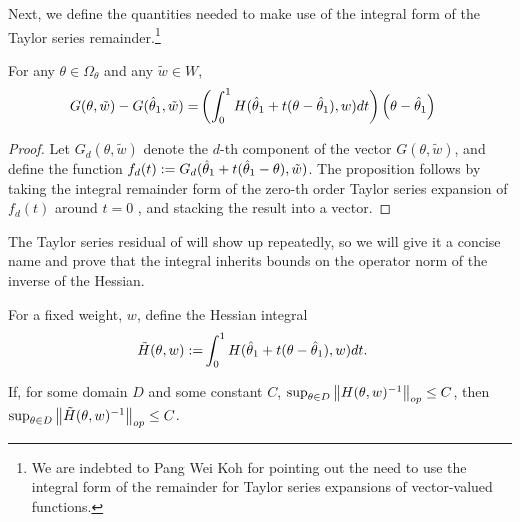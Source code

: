 Next, we define the quantities needed to make use of the integral form of
the Taylor series remainder.\footnote{We are indebted to Pang Wei Koh for
pointing out the need to use the integral form of the remainder for
Taylor series expansions of vector-valued functions.}

\begin{prop}
\label{propref:taylor_series_remainder}
%
For any $\theta \in \Omega_{\theta}$ and any $\tilde{w} \in W$,
%
\begin{align*}
G(\theta, \tilde{w}) - G(\hat{\theta}_{1}, \tilde{w}) =&
    \left(\int_0^1 H(\hat{\theta}_{1} + t (\theta - \hat{\theta}_{1}), w) dt\right)
    \left(\theta - \hat{\theta}_{1}\right)
\end{align*}
%
\end{prop}
%
\begin{proof}
%
Let $G_d(\theta, \tilde{w})$ denote the $d$-th component of the vector
$G(\theta, \tilde{w})$, and define the function $f_d(t) := G_d(\hat{\theta}_{1} + t
(\hat{\theta}_{1} - \theta), \tilde{w})$. The proposition follows by taking the
integral remainder form of the zero-th order Taylor series expansion of $f_d(t)$
around $t=0$ \citep[Appendix B.2]{dudley:2018:analysis}, and stacking the result
into a vector.
%
\end{proof}


The Taylor series residual of  will show up
repeatedly, so we will give it a concise name and prove that the integral
inherits bounds on the operator norm of the inverse of the Hessian.


\begin{defn}
\label{defref:hess_integral}
%
For a fixed weight, $w$, define the Hessian integral
%
\begin{align*}
\tilde{H}(\theta, w) :=&
    \int_0^1 H(\hat{\theta}_{1} + t (\theta - \hat{\theta}_{1}), w) dt.
\end{align*}
\end{defn}




\begin{lem}\label{lem:hess_integral_invertible}
%
If, for some domain $D$ and some constant $C$, $\sup_{\theta \in D}
\left\Vert H(\theta, w)^{-1}\right\Vert_{op} \le C$, then
$\sup_{\theta \in D} \left\Vert \tilde{H}(\theta, w)^{-1}\right\Vert_{op} \le C$.
%
\end{lem}

